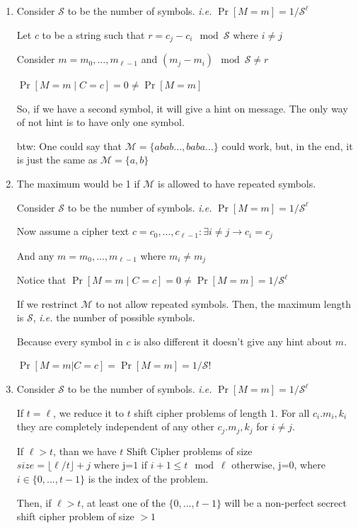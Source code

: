 \begin{enumerate}
	\item[(a)] Consider $\mathcal{S}$ to be the number of symbols. \textit{i.e.} $\Pr[M = m]  = 1 /  \mathcal{S}^\ell$
		
	Let $c$ to be a string such that $r = c_j - c_i \mod \mathcal{S}  \text{ where } i \ne j$
	
	Consider $m = m_0, ..., m_{\ell - 1}$ and $(m_j - m_i) \mod \mathcal{S} \ne r$
	
	$\Pr[M = m \mid C = c] = 0 \ne \Pr[M = m]$
	
	So, if we have a second symbol, it will give a hint on message. The only way of not hint is to have only one symbol.
	
	btw: One could say that $\mathcal{M} = \{abab..., baba...\}$ could work, but, in the end, it is just the same as  $\mathcal{M} = \{a, b\}$
	
	\item[(b)] The maximum would be 1 if $\mathcal{M}$ is allowed to have repeated symbols.
	
	Consider $\mathcal{S}$ to be the number of symbols. \textit{i.e.} $\Pr[M = m]  = 1 /  \mathcal{S}^\ell$
	
	Now assume a cipher text $c = {c_0, ..., c_{\ell-1}} : \exists i \ne j \rightarrow c_i = c_j$
	
	And any $m = {m_0, ..., m_{\ell-1}}$ where $m_i \ne m_j$
	
	Notice that $\Pr[M = m \mid C = c] = 0 \ne \Pr[M = m] = 1 / \mathcal{S}^{\ell}$
	
	If we restrinct $\mathcal{M}$ to not allow repeated symbols. Then, the maximum length is $\mathcal{S}$, \textit{i.e.} the number of possible symbols.
	
	Because every symbol in $c$ is also different it doesn't give any hint about $m$.
	
	$\Pr[M = m | C = c] = \Pr[M = m] = 1 / \mathcal{S}!$
	
	\item[(c)] Consider $\mathcal{S}$ to be the number of symbols. \textit{i.e.} $\Pr[M = m]  = 1 /  \mathcal{S}^\ell$
	
	If $t = \ell$, we reduce it to $t$ shift cipher problems of length $1$. For all $c_i. m_i, k_i$ they are completely independent of any other $c_j. m_j, k_j$ for $i \ne j$.
	
	If $\ell > t$, than we have $t$ Shift Cipher problems of size $size = \lfloor\ell / t\rfloor + j \text{ where j=1 if $i + 1 \leq t \mod \ell $ otherwise, j=0}$, where $i \in \{0,...,t-1\}$ is the index of the problem.
	
	Then, if $\ell > t$, at least one of the $\{0,...,t-1\}$ will be a non-perfect secrect shift cipher problem of size $> 1$
	
\end{enumerate}

